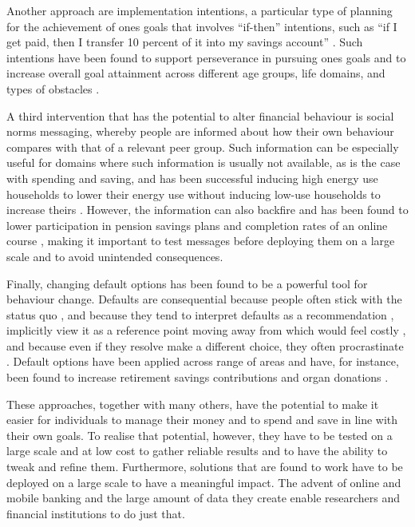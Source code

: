 Another approach are implementation intentions, a particular type of planning
for the achievement of ones goals that involves ``if-then'' intentions, such as
``if I get paid, then I transfer 10 percent of it into my savings account''
\citep{gollwitzer2006implementation, rogers2015beyond}. Such intentions have
been found to support perseverance in pursuing ones goals
\citep{oettingen2010strategies} and to increase overall goal attainment across
different age groups, life domains, and types of obstacles
\citep{gollwitzer2006implementation}.

A third intervention that has the potential to alter financial behaviour is
social norms messaging, whereby people are informed about how their own
behaviour compares with that of a relevant peer group. Such information can be
especially useful for domains where such information is usually not available,
as is the case with spending and saving, and has been successful inducing high
energy use households to lower their energy use without inducing low-use
households to increase theirs \citep{schultz2007constructive,
allcott2011social, allcott2014short, brandon2017effects}. However, the
information can also backfire and has been found to lower participation in
pension savings plans \citep{beshears2015effect} and completion rates of an
online course \citep{rogers2016discouraged}, making it important to test
messages before deploying them on a large scale and to avoid unintended
consequences.

Finally, changing default options has been found to be a powerful tool for
behaviour change. Defaults are consequential because people often stick
with the status quo \citet{samuelson1988status}, and because they tend to
interpret defaults as a recommendation \citep{mckenzie2006recommendations},
implicitly view it as a reference point moving away from which would feel
costly \citet{johnson2003defaults, kahneman1979prospect}, and because even if
they resolve make a different choice, they often procrastinate
\citet{carroll2009optimal, ericson2017interaction}. Default options have been
applied across range of areas and have, for instance, been found to increase
retirement savings contributions \citep{madrian2001power,
beshears2009importance} and organ donations \citep{johnson2003defaults,
gimbel2003presumed, abadie2006impact}.

These approaches, together with many others, have the potential to make it
easier for individuals to manage their money and to spend and save in line with
their own goals. To realise that potential, however, they have to be tested on
a large scale and at low cost to gather reliable results and to have the
ability to tweak and refine them. Furthermore, solutions that are found to work
have to be deployed on a large scale to have a meaningful impact. The advent of
online and mobile banking and the large amount of data they create enable
researchers and financial institutions to do just that.


